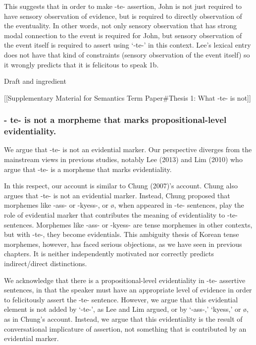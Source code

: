 This suggests that in order to make -te- assertion, John is not just
required to have sensory observation of evidence, but is required to
directly observation of the eventuality. In other words, not only
sensory observation that has strong modal connection to the event is
required for John, but sensory observation of the event itself is
required to assert using `-te-' in this context. Lee's lexical entry
does not have that kind of constraints (sensory observation of the event
itself) so it wrongly predicts that it is felicitous to speak 1b.

Draft and ingredient

{[}{[}Supplementary Material for Semantics Term Paper\#Thesis 1: What
-te- is not{]}{]}

\hypertarget{te--is-not-a-morpheme-that-marks-propositional-level-evidentiality.}{%
\subsubsection{- te- is not a morpheme that marks propositional-level
evidentiality.}\label{te--is-not-a-morpheme-that-marks-propositional-level-evidentiality.}}

We argue that -te- is not an evidential marker. Our perspective diverges
from the mainstream views in previous studies, notably Lee (2013) and
Lim (2010) who argue that -te- is a morpheme that marks evidentiality.

In this respect, our account is similar to Chung (2007)'s account. Chung
also argues that -te- is not an evidential marker. Instead, Chung
proposed that morphemes like -ass- or -kyess-, or ø, when appeared in
-te- sentences, play the role of evidential marker that contributes the
meaning of evidentiality to -te- sentences. Morphemes like -ass- or
-kyess- are tense morphemes in other contexts, but with -te-, they
become evidentials. This ambiguity thesis of Korean tense morphemes,
however, has faced serious objections, as we have seen in previous
chapters. It is neither independently motivated nor correctly predicts
indirect/direct distinctions.

We acknowledge that there is a propositional-level evidentiality in -te-
assertive sentences, in that the speaker must have an appropriate level
of evidence in order to felicitously assert the -te- sentence. However,
we argue that this evidential element is not added by `-te-', as Lee and
Lim argued, or by `-ass-,' `kyess,' or ø, as in Chung's account.
Instead, we argue that this evidentiality is the result of
conversational implicature of assertion, not something that is
contributed by an evidential marker.

